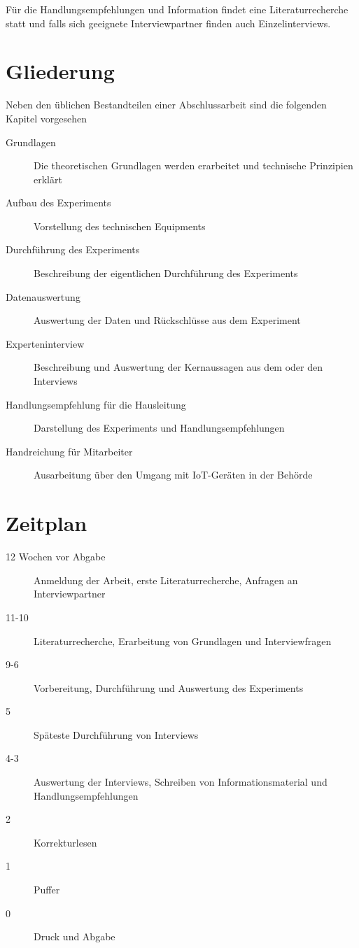 \documentclass[12pt, a4paper, onecolumn, oneside, toc=bibliographynumbered, liststotoc]{scrartcl} %
\begin{document}
Für die Handlungsempfehlungen und Information findet eine Literaturrecherche statt und falls sich geeignete Interviewpartner finden auch Einzelinterviews.

	
	\section{Gliederung}
Neben den üblichen Bestandteilen einer Abschlussarbeit sind die folgenden Kapitel vorgesehen
\begin{description}
\item[Grundlagen] Die theoretischen Grundlagen werden erarbeitet und technische Prinzipien erklärt
\item[Aufbau des Experiments] Vorstellung des technischen Equipments  
\item[Durchführung des Experiments] Beschreibung der eigentlichen Durchführung des Experiments
\item[Datenauswertung] Auswertung der Daten und Rückschlüsse aus dem Experiment
\item[Experteninterview] Beschreibung und Auswertung der Kernaussagen aus dem oder den Interviews
\item[Handlungsempfehlung für die Hausleitung] Darstellung des Experiments und Handlungsempfehlungen
\item[Handreichung für Mitarbeiter] Ausarbeitung über den Umgang mit IoT-Geräten in der Behörde
\end{description}
	
	\section{Zeitplan}
\begin{description}
\item[12 Wochen vor Abgabe] Anmeldung der Arbeit, erste Literaturrecherche, Anfragen an Interviewpartner
\item[11-10] Literaturrecherche, Erarbeitung von Grundlagen und Interviewfragen
\item[9-6] Vorbereitung, Durchführung und Auswertung des Experiments
\item[5] Späteste Durchführung von Interviews
\item[4-3] Auswertung der Interviews, Schreiben von Informationsmaterial und Handlungsempfehlungen
\item[2] Korrekturlesen
\item[1] Puffer
\item[0] Druck und Abgabe
\end{description}
\end{document}
